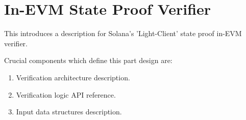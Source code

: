 \chapter{In-EVM State Proof Verifier}

This introduces a description for Solana's 'Light-Client' state proof in-EVM
verifier.

Crucial components which define this part design are:
\begin{enumerate}
    \item Verification architecture description.
    \item Verification logic API reference.
    \item Input data structures description.
\end{enumerate}





